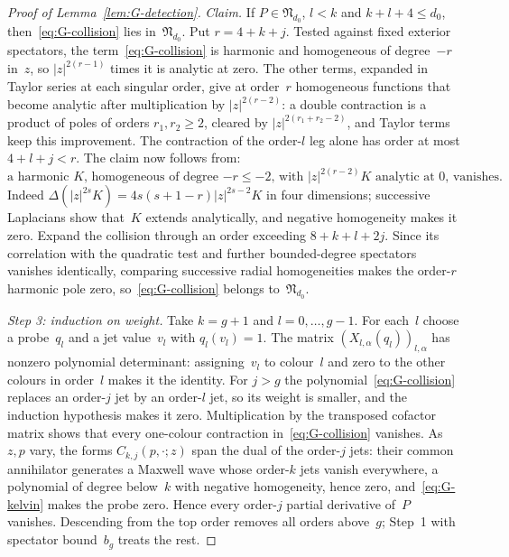 \begin{proof}[Proof of Lemma~\ref{lem:G-detection}]
\emph{Claim.} If $P\in\mathfrak N_{d_0}$, $l<k$ and $k+l+4\le d_0$, then~\eqref{eq:G-collision} lies in~$\mathfrak N_{d_0}$. Put $r=4+k+j$. Tested against fixed exterior spectators, the term~\eqref{eq:G-collision} is harmonic and homogeneous of degree~$-r$ in~$z$, so $|z|^{2(r-1)}$ times it is analytic at zero. The other terms, expanded in Taylor series at each singular order, give at order~$r$ homogeneous functions that become analytic after multiplication by $|z|^{2(r-2)}$: a double contraction is a product of poles of orders $r_1,r_2\ge2$, cleared by $|z|^{2(r_1+r_2-2)}$, and Taylor terms keep this improvement. The contraction of the order-$l$ leg alone has order at most $4+l+j<r$. The claim now follows from:
\begin{equation*}
\text{a harmonic $K$, homogeneous of degree $-r\le-2$, with $|z|^{2(r-2)}K$ analytic at $0$, vanishes.}
\end{equation*}
Indeed $\Delta(|z|^{2s}K)=4s(s+1-r)|z|^{2s-2}K$ in four dimensions; successive Laplacians show that~$K$ extends analytically, and negative homogeneity makes it zero. Expand the collision through an order exceeding $8+k+l+2j$. Since its correlation with the quadratic test and further bounded-degree spectators vanishes identically, comparing successive radial homogeneities makes the order-$r$ harmonic pole zero, so~\eqref{eq:G-collision} belongs to~$\mathfrak N_{d_0}$.

\emph{Step 3: induction on weight.} Take $k=g+1$ and $l=0,\ldots,g-1$. For each~$l$ choose a probe~$q_l$ and a jet value~$v_l$ with $q_l(v_l)=1$. The matrix $(X_{l,\alpha}(q_l))_{l,\alpha}$ has nonzero polynomial determinant: assigning~$v_l$ to colour~$l$ and zero to the other colours in order~$l$ makes it the identity. For $j>g$ the polynomial~\eqref{eq:G-collision} replaces an order-$j$ jet by an order-$l$ jet, so its weight is smaller, and the induction hypothesis makes it zero. Multiplication by the transposed cofactor matrix shows that every one-colour contraction in~\eqref{eq:G-collision} vanishes. As $z,p$ vary, the forms $C_{k,j}(p,\cdot;z)$ span the dual of the order-$j$ jets: their common annihilator generates a Maxwell wave whose order-$k$ jets vanish everywhere, a polynomial of degree below~$k$ with negative homogeneity, hence zero, and~\eqref{eq:G-kelvin} makes the probe zero. Hence every order-$j$ partial derivative of~$P$ vanishes. Descending from the top order removes all orders above~$g$; Step~1 with spectator bound~$b_g$ treats the rest.
\end{proof}

